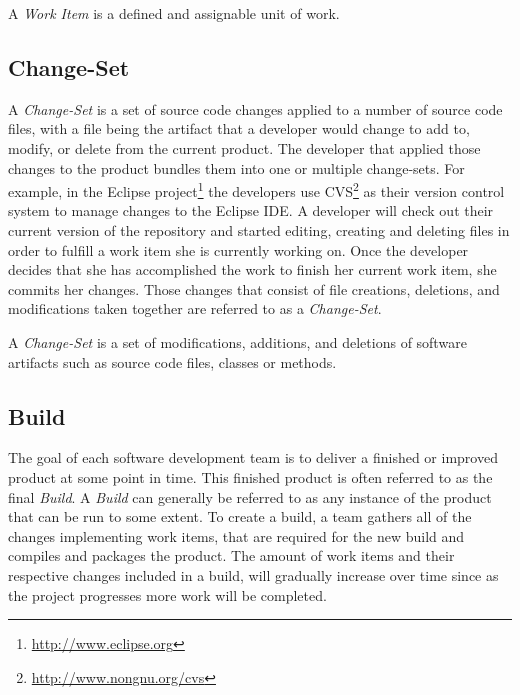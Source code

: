 \begin{note}
\begin{mydef}
A \emph{Work Item} is a defined and assignable unit of work.
\end{mydef}
\end{note} 

\subsection{Change-Set}
A \emph{Change-Set} is a set of source code changes applied to a number of source code files, with a file being the artifact that a developer would change to add to, modify, or delete from the current product. 
The developer that applied those changes to the product bundles them into one or multiple change-sets.
For example, in the Eclipse project\footnote{\url{http://www.eclipse.org}} the developers use CVS\footnote{\url{http://www.nongnu.org/cvs}} as their version control system to manage changes to the Eclipse IDE.
A developer will check out their current version of the repository and started editing, creating and deleting files in order to fulfill a work item she is currently working on.
Once the developer decides that she has accomplished the work to finish her current work item, she commits her changes.
Those changes that consist of file creations, deletions, and modifications taken together are referred to as a \emph{Change-Set}. 

\begin{note}
\begin{mydef}
A \emph{Change-Set} is a set of modifications, additions, and deletions of software artifacts such as source code files, classes or methods.
\end{mydef}
\end{note}

\subsection{Build}
The goal of each software development team is to deliver a finished or improved product at some point in time.
This finished product is often referred to as the final \emph{Build}.
A \emph{Build} can generally be referred to as any instance of the product that can be run to some extent.
To create a build, a team gathers all of the changes implementing work items, that are required for the new build and compiles and packages the product.
The amount of work items and their respective changes included in a build, will gradually increase over time since as the project progresses more work will be completed.

